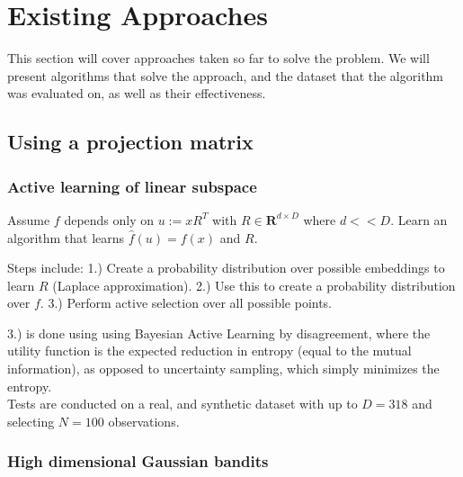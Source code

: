 
\chapter{Existing Approaches}

\ifpdf
    \graphicspath{{Chapter2/Figs/Raster/}{Chapter2/Figs/PDF/}{Chapter2/Figs/}}
\else
    \graphicspath{{Chapter2/Figs/Vector/}{Chapter2/Figs/}}
\fi

This section will cover approaches taken so far to solve the problem.
We will present algorithms that solve the approach, and the dataset that the algorithm was evaluated on, as well as their effectiveness.

\section{Using a projection matrix}

\subsection{Active learning of linear subspace}

\citep{Garnett2013} Assume $f$ depends only on $ u := xR^T $ with $ R \in \mathbf{R}^{d \times D}$ where $d << D$. 
Learn an algorithm that learns $\hat{f}(u) = f(x)$ and $R$.

Steps include: 1.) Create a probability distribution over possible embeddings to learn $R$ (Laplace approximation).
2.) Use this to create a probability distribution over $f$.
3.) Perform active selection over all possible points.

3.) is done using using Bayesian Active Learning by disagreement, where the utility function is the expected reduction in entropy (equal to the mutual information), as opposed to uncertainty sampling, which simply minimizes the entropy. \\

Tests are conducted on a real, and synthetic dataset with up to $D = 318$ and selecting $N = 100$ observations. 

\subsection{High dimensional Gaussian bandits}

